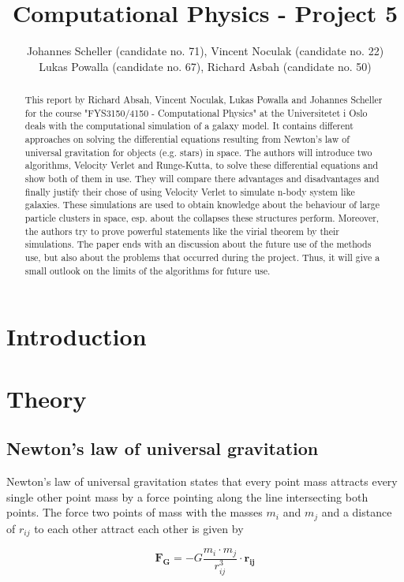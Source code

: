 \documentclass[10pt,a4paper]{article}
\author{Johannes Scheller (candidate no. 71), Vincent Noculak (candidate no. 22)\\ Lukas Powalla (candidate no. 67), Richard Asbah (candidate no. 50) }
\title{Computational Physics - Project 5}
\begin{document}
\maketitle
\newpage
\tableofcontents
\newpage

\begin{abstract}
This report by Richard Absah, Vincent Noculak, Lukas Powalla and Johannes Scheller for the course "FYS3150/4150 - Computational Physics" at the Universitetet i Oslo deals with the computational simulation of a galaxy model. It contains different approaches on solving the differential equations resulting from Newton's law of universal gravitation for objects (e.g. stars) in space. The authors will introduce two algorithms, Velocity Verlet and Runge-Kutta, to solve these differential equations and show both of them in use. They will compare there advantages and disadvantages and finally justify their chose of using Velocity Verlet to simulate n-body system like galaxies. These simulations are used to obtain knowledge about the behaviour of large particle clusters in space, esp. about the collapses these structures perform. Moreover, the authors try to prove powerful statements like the virial theorem by their simulations. The paper ends with an discussion about the future use of the methods use, but also about the problems that occurred during the project. Thus, it will give a small outlook on the limits of the algorithms for future use.
\end{abstract}
\section{Introduction}
\section{Theory}

\subsection{Newton's law of universal gravitation}

Newton's law of universal gravitation states that every point mass attracts every single other point mass by a force pointing along the line intersecting both points. The force two points of mass with the masses $m_i$ and $m_j$ and a distance of $r_{ij}$ to each other attract each other is given by

\begin{equation}	
\label{eq:gra}
\mathbf{F_G} = - G \frac{m_i \cdot m_j}{r_{ij}^3} \cdot \mathbf{r_{ij}}
\end{equation}
\end{document}
